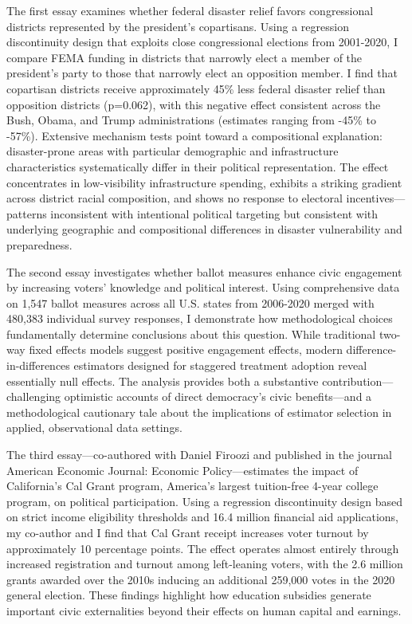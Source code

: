 \documentclass[12pt,letterpaper,oneside]{book}
\begin{document}
The first essay examines whether federal disaster relief favors congressional districts represented by the president's copartisans. Using a regression discontinuity design that exploits close congressional elections from 2001-2020, I compare FEMA funding in districts that narrowly elect a member of the president's party to those that narrowly elect an opposition member. I find that copartisan districts receive approximately 45\% less federal disaster relief than opposition districts (p=0.062), with this negative effect consistent across the Bush, Obama, and Trump administrations (estimates ranging from -45\% to -57\%). Extensive mechanism tests point toward a compositional explanation: disaster-prone areas with particular demographic and infrastructure characteristics systematically differ in their political representation. The effect concentrates in low-visibility infrastructure spending, exhibits a striking gradient across district racial composition, and shows no response to electoral incentives---patterns inconsistent with intentional political targeting but consistent with underlying geographic and compositional differences in disaster vulnerability and preparedness.

The second essay investigates whether ballot measures enhance civic engagement by increasing voters' knowledge and political interest. Using comprehensive data on 1,547 ballot measures across all U.S. states from 2006-2020 merged with 480,383 individual survey responses, I demonstrate how methodological choices fundamentally determine conclusions about this question. While traditional two-way fixed effects models suggest positive engagement effects, modern difference-in-differences estimators designed for staggered treatment adoption reveal essentially null effects. The analysis provides both a substantive contribution—challenging optimistic accounts of direct democracy's civic benefits—and a methodological cautionary tale about the implications of estimator selection in applied, observational data settings.

The third essay---co-authored with Daniel Firoozi and published in the journal American Economic Journal: Economic Policy---estimates the impact of California's Cal Grant program, America's largest tuition-free 4-year college program, on political participation. Using a regression discontinuity design based on strict income eligibility thresholds and 16.4 million financial aid applications, my co-author and I find that Cal Grant receipt increases voter turnout by approximately 10 percentage points. The effect operates almost entirely through increased registration and turnout among left-leaning voters, with the 2.6 million grants awarded over the 2010s inducing an additional 259,000 votes in the 2020 general election. These findings highlight how education subsidies generate important civic externalities beyond their effects on human capital and earnings.
\end{document}
